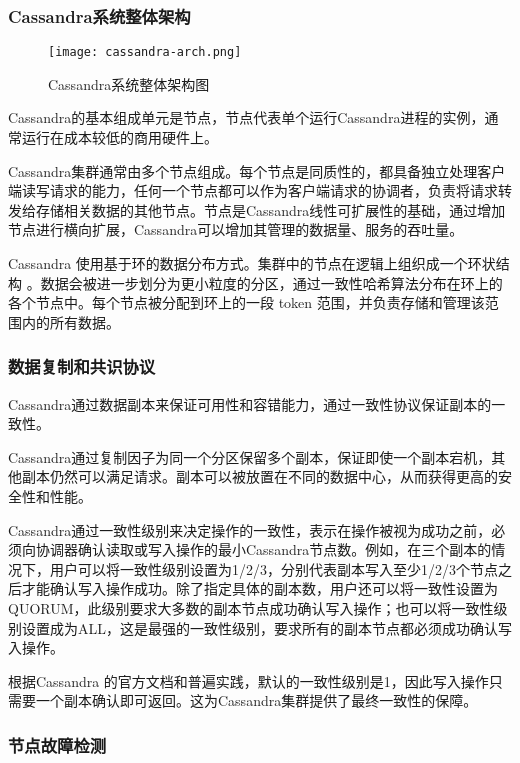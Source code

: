 \subsubsection{Cassandra系统整体架构}

\begin{figure}
  \centering
  \texttt{[image: cassandra-arch.png]}
  \caption{Cassandra系统整体架构图}
  \label{fig:cassandra-arch}
\end{figure}

Cassandra的基本组成单元是节点，节点代表单个运行Cassandra进程的实例，通常运行在成本较低的商用硬件上。

Cassandra集群通常由多个节点组成。每个节点是同质性的，都具备独立处理客户端读写请求的能力，任何一个节点都可以作为客户端请求的协调者，负责将请求转发给存储相关数据的其他节点。节点是Cassandra线性可扩展性的基础，通过增加节点进行横向扩展，Cassandra可以增加其管理的数据量、服务的吞吐量。

Cassandra 使用基于环的数据分布方式。集群中的节点在逻辑上组织成一个环状结构 。数据会被进一步划分为更小粒度的分区，通过一致性哈希算法\cite{karger1997consistent}分布在环上的各个节点中。每个节点被分配到环上的一段 token 范围，并负责存储和管理该范围内的所有数据。

\subsubsection{数据复制和共识协议}


Cassandra通过数据副本来保证可用性和容错能力，通过一致性协议保证副本的一致性。

Cassandra通过复制因子为同一个分区保留多个副本，保证即使一个副本宕机，其他副本仍然可以满足请求。副本可以被放置在不同的数据中心，从而获得更高的安全性和性能。

Cassandra通过一致性级别来决定操作的一致性，表示在操作被视为成功之前，必须向协调器确认读取或写入操作的最小Cassandra节点数。例如，在三个副本的情况下，用户可以将一致性级别设置为1/2/3，分别代表副本写入至少1/2/3个节点之后才能确认写入操作成功。除了指定具体的副本数，用户还可以将一致性设置为QUORUM，此级别要求大多数的副本节点成功确认写入操作；也可以将一致性级别设置成为ALL，这是最强的一致性级别，要求所有的副本节点都必须成功确认写入操作。

根据Cassandra 的官方文档和普遍实践，默认的一致性级别是1，因此写入操作只需要一个副本确认即可返回。这为Cassandra集群提供了最终一致性的保障。

\subsubsection{节点故障检测}\label{sec:cassandra-failure-detecttion}

